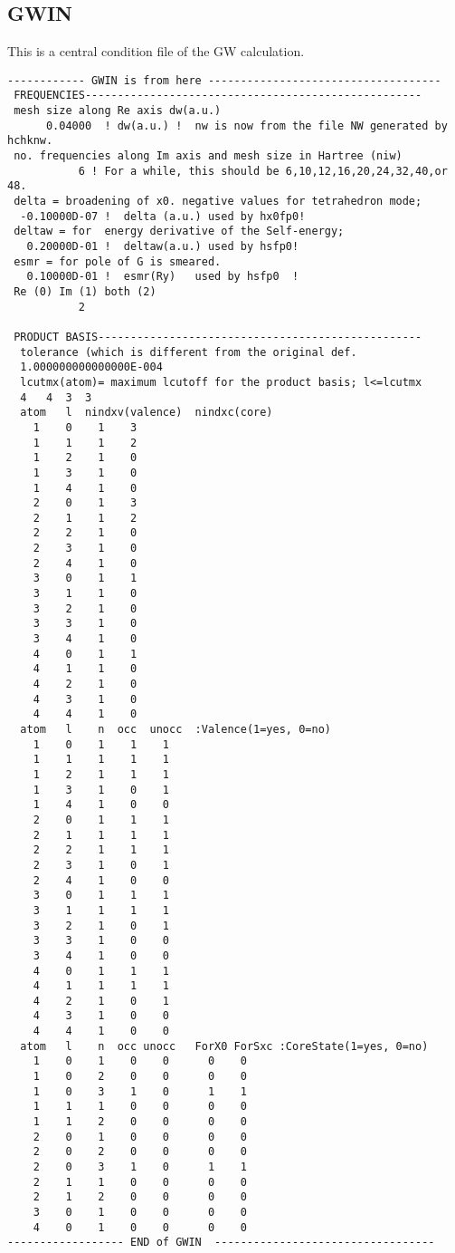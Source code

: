 \documentclass[a4paper,10pt,epsf,fleqn]{article}
\newcommand{\fx}[1]{\subsection{\sf #1\index{\sf #1}}}
\begin{document}
{%
\newpage
\fx{GWIN} This is a central condition file of the GW calculation.
{\baselineskip=2.6mm
\begin{verbatim}
------------ GWIN is from here ------------------------------------
 FREQUENCIES----------------------------------------------------
 mesh size along Re axis dw(a.u.)
      0.04000  ! dw(a.u.) !  nw is now from the file NW generated by hchknw.
 no. frequencies along Im axis and mesh size in Hartree (niw)
           6 ! For a while, this should be 6,10,12,16,20,24,32,40,or 48.
 delta = broadening of x0. negative values for tetrahedron mode;
  -0.10000D-07 !  delta (a.u.) used by hx0fp0!
 deltaw = for  energy derivative of the Self-energy;
   0.20000D-01 !  deltaw(a.u.) used by hsfp0!
 esmr = for pole of G is smeared.
   0.10000D-01 !  esmr(Ry)   used by hsfp0  !
 Re (0) Im (1) both (2)
           2

 PRODUCT BASIS--------------------------------------------------
  tolerance (which is different from the original def.
  1.000000000000000E-004
  lcutmx(atom)= maximum lcutoff for the product basis; l<=lcutmx
  4   4  3  3
  atom   l  nindxv(valence)  nindxc(core)
    1    0    1    3
    1    1    1    2
    1    2    1    0
    1    3    1    0
    1    4    1    0
    2    0    1    3
    2    1    1    2
    2    2    1    0
    2    3    1    0
    2    4    1    0
    3    0    1    1
    3    1    1    0
    3    2    1    0
    3    3    1    0
    3    4    1    0
    4    0    1    1
    4    1    1    0
    4    2    1    0
    4    3    1    0
    4    4    1    0
  atom   l    n  occ  unocc  :Valence(1=yes, 0=no)
    1    0    1    1    1
    1    1    1    1    1
    1    2    1    1    1
    1    3    1    0    1
    1    4    1    0    0
    2    0    1    1    1
    2    1    1    1    1
    2    2    1    1    1
    2    3    1    0    1
    2    4    1    0    0
    3    0    1    1    1
    3    1    1    1    1
    3    2    1    0    1
    3    3    1    0    0
    3    4    1    0    0
    4    0    1    1    1
    4    1    1    1    1
    4    2    1    0    1
    4    3    1    0    0
    4    4    1    0    0
  atom   l    n  occ unocc   ForX0 ForSxc :CoreState(1=yes, 0=no)
    1    0    1    0    0      0    0
    1    0    2    0    0      0    0
    1    0    3    1    0      1    1
    1    1    1    0    0      0    0
    1    1    2    0    0      0    0
    2    0    1    0    0      0    0
    2    0    2    0    0      0    0
    2    0    3    1    0      1    1
    2    1    1    0    0      0    0
    2    1    2    0    0      0    0
    3    0    1    0    0      0    0
    4    0    1    0    0      0    0
------------------ END of GWIN  ----------------------------------
\end{verbatim}}

}
\end{document}
